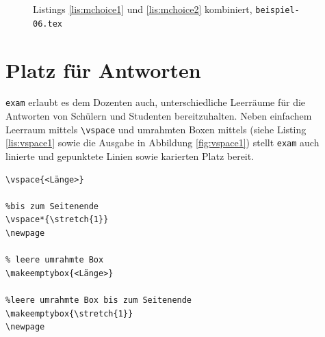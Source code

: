 \begin{figure}
\caption{Listings \ref{lis:mchoice1} und \ref{lis:mchoice2} kombiniert, \texttt{beispiel-06.tex}}\label{fig:mchoicea}
\end{figure}

\clearpage

\section{Platz für Antworten}

\texttt{exam} erlaubt es dem Dozenten auch, unterschiedliche Leerräume für die Antworten von Schülern und Studenten bereitzuhalten. Neben einfachem Leerraum mittels \texttt{\textbackslash vspace} und umrahmten Boxen mittels (siehe Listing \ref{lis:vspace1} sowie die Ausgabe in Abbildung \ref{fig:vspace1}) stellt \texttt{exam} auch linierte und gepunktete Linien sowie karierten Platz bereit.

\begin{lstlisting}[caption={Leerraum und Boxen für Antworten}, label={lis:vspace1}]
% einfacher Abstand
\vspace{<Länge>}

%bis zum Seitenende
\vspace*{\stretch{1}}
\newpage

% leere umrahmte Box
\makeemptybox{<Länge>}

%leere umrahmte Box bis zum Seitenende
\makeemptybox{\stretch{1}}
\newpage
\end{lstlisting}

